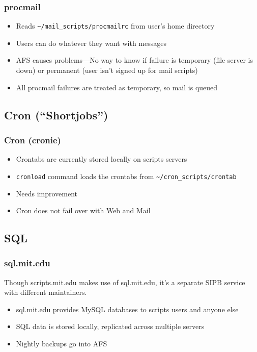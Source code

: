 \begin{frame}[fragile]
  \frametitle{procmail}
  \begin{itemize}
    \item Reads \verb|~/mail_scripts/procmailrc| from user's home directory
    \item Users can do whatever they want with messages
    \item AFS causes problems---No way to know if failure is temporary (file server is down) or permanent (user isn't signed up for mail scripts)
    \item All procmail failures are treated as temporary, so mail is queued
  \end{itemize}
\end{frame}

\subsection{Cron (``Shortjobs'')}

\begin{frame}[fragile]
  \frametitle{Cron (cronie)}
  \begin{itemize}
    \item Crontabs are currently stored locally on scripts servers
    \item {\tt cronload} command loads the crontabs from
      \verb|~/cron_scripts/crontab| \pause
    \item Needs improvement
    \item Cron does not fail over with Web and Mail
  \end{itemize}
\end{frame}

\subsection{SQL}

\begin{frame}
  \frametitle{sql.mit.edu}
  Though scripts.mit.edu makes use of sql.mit.edu, it's a separate SIPB service with different maintainers.
\begin{itemize}
\item sql.mit.edu provides MySQL databases to scripts users and anyone else
\item SQL data is stored locally, replicated across multiple servers
\item Nightly backups go into AFS
\end{itemize}
\end{frame}

